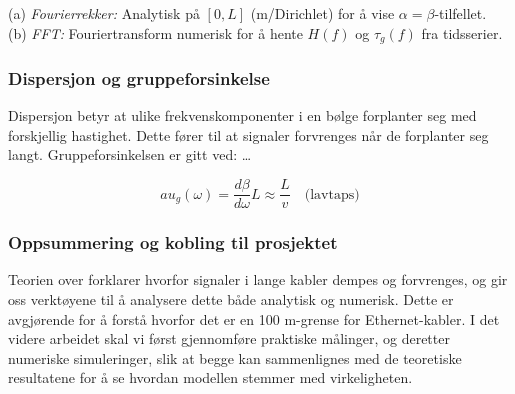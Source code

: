 (a) \textit{Fourierrekker:} Analytisk på $[0,L]$ (m/Dirichlet) for å vise $\alpha=\beta$-tilfellet.\\
(b) \textit{FFT:} Fouriertransform numerisk for å hente $H(f)$ og $\tau_g(f)$ fra tidsserier.

\subsubsection{Dispersjon og gruppeforsinkelse}

Dispersjon betyr at ulike frekvenskomponenter i en bølge forplanter seg med forskjellig hastighet. Dette fører til at signaler forvrenges når de forplanter seg langt. Gruppeforsinkelsen er gitt ved:
\clearpage
\dots

\begin{equation}
	au_g(\omega) = \frac{d\beta}{d\omega} L \approx \frac{L}{v} \quad \text{(lavtaps)}
\end{equation}

\subsubsection{Oppsummering og kobling til prosjektet}

Teorien over forklarer hvorfor signaler i lange kabler dempes og forvrenges, og gir oss verktøyene til å analysere dette både analytisk og numerisk. Dette er avgjørende for å forstå hvorfor det er en 100 m-grense for Ethernet-kabler. I det videre arbeidet skal vi først gjennomføre praktiske målinger, og deretter numeriske simuleringer, slik at begge kan sammenlignes med de teoretiske resultatene for å se hvordan modellen stemmer med virkeligheten.